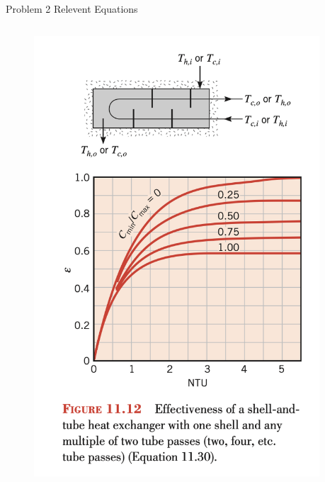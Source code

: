 \documentclass[9pt, aspectratio=169, handout]{beamer}
\begin{document}
\begin{frame}{Problem 2 Relevent Equations}
    \begin{columns}
        \begin{column}{0.25\textwidth}
            \begin{figure}
                \begin{center}
                    \includegraphics[width=0.95\textwidth]{Figures/fig7.1.png}
                \end{center}
            \end{figure}
        \end{column}
        


\end{columns}
\end{frame}
\end{document}
